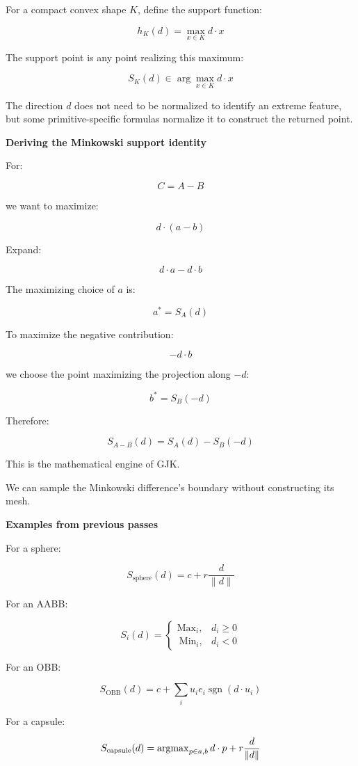For a compact convex shape \(K\), define the support function:

\[
\boxed{ h_K(d)=\max_{x\in K}d\cdot x }
\]

The support point is any point realizing this maximum:

\[
\boxed{ S_K(d)\in\arg\max_{x\in K}d\cdot x }
\]

The direction \(d\) does not need to be normalized to identify an extreme feature, but some primitive-specific formulas normalize it to construct the returned point.

\textbf{Deriving the Minkowski support identity}

For:

\[
C=A-B
\]

we want to maximize:

\[
d\cdot(a-b)
\]

Expand:

\[
d\cdot a-d\cdot b
\]

The maximizing choice of \(a\) is:

\[
a^*=S_A(d)
\]

To maximize the negative contribution:

\[
-d\cdot b
\]

we choose the point maximizing the projection along \(-d\):

\[
b^*=S_B(-d)
\]

Therefore:

\[
\boxed{ S_{A-B}(d)=S_A(d)-S_B(-d) }
\]

This is the mathematical engine of GJK.

We can sample the Minkowski difference's boundary without constructing its mesh.

\textbf{Examples from previous passes}

For a sphere:

\[
S_{\mathrm{sphere}}(d)=c+r\frac d{\|d\|}
\]

For an AABB:

\[
S_i(d)= \begin{cases} \mathrm{Max}_i,&d_i\ge0\\\ \mathrm{Min}_i,&d_i<0 \end{cases}
\]

For an OBB:

\[
S_{\mathrm{OBB}}(d)= c+\sum_i u_ie_i\operatorname{sgn}(d\cdot u_i)
\]

For a capsule:

\[
S_{\mathrm{capsule}}(d)= \operatorname{argmax}_{p\in\\{a,b\\}}d\cdot p +r\frac d{\|d\|}
\]

